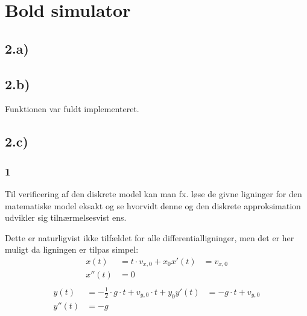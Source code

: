 \section{Bold simulator}
\subsection*{2.a)}


\subsection*{2.b)}
Funktionen var fuldt implementeret.

\subsection*{2.c)}
\subsubsection*{1}
Til verificering af den diskrete model kan man fx. løse de givne ligninger for den matematiske model
eksakt og se hvorvidt denne og den diskrete approksimation udvikler sig tilnærmelsesvist ens.

Dette er naturligvist ikke tilfældet for alle differentialligninger, men det er her muligt da ligningen
er tilpas simpel:
\begin{align}
x(t) 	&= t \cdot v_{x,0} + x_0 
x'(t) 	&= v_{x,0} \\
x''(t) 	&= 0 \\
\end{align}
\begin{align}
y(t)	&= -\frac{1}{2} \cdot g \cdot t + v_{y,0} \cdot t + y_0
y'(t)	&= -g \cdot t + v_{y,0} \\
y''(t)	&= -g \\
\end{align}

